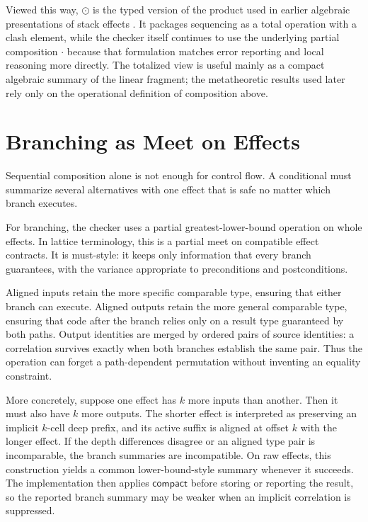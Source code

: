 \documentclass[acmsmall,screen,review,anonymous,nonacm]{acmart}
\newcommand{\compose}{\mathbin{\cdot}}
\newcommand{\compact}{\mathsf{compact}}
\begin{document}
Viewed this way, $\odot$ is the typed version of the product used in earlier algebraic presentations of stack effects \cite{poial1994algebraic,poial2006typing}. It packages sequencing as a total operation with a clash element, while the checker itself continues to use the underlying partial composition $\compose$ because that formulation matches error reporting and local reasoning more directly. The totalized view is useful mainly as a compact algebraic summary of the linear fragment; the metatheoretic results used later rely only on the operational definition of composition above.

\section{Branching as Meet on Effects}
Sequential composition alone is not enough for control flow. A conditional must summarize several alternatives with one effect that is safe no matter which branch executes.

For branching, the checker uses a partial greatest-lower-bound operation on whole
effects. In lattice terminology, this is a partial meet on compatible effect contracts.
It is must-style: it keeps only information that every branch guarantees, with the
variance appropriate to preconditions and postconditions.

Aligned inputs retain the more specific comparable type, ensuring that either branch can
execute. Aligned outputs retain the more general comparable type, ensuring that code
after the branch relies only on a result type guaranteed by both paths. Output identities
are merged by ordered pairs of source identities: a correlation survives exactly when
both branches establish the same pair. Thus the operation can forget a path-dependent
permutation without inventing an equality constraint.

More concretely, suppose one effect has $k$ more inputs than another. Then it must also
have $k$ more outputs. The shorter effect is interpreted as preserving an implicit
$k$-cell deep prefix, and its active suffix is aligned at offset $k$ with the longer
effect. If the depth differences disagree or an aligned type pair is incomparable, the
branch summaries are incompatible. On raw effects, this construction yields a common
lower-bound-style summary whenever it succeeds. The implementation then applies
$\compact$ before storing or reporting the result, so the reported branch summary may be
weaker when an implicit correlation is suppressed.
\end{document}
